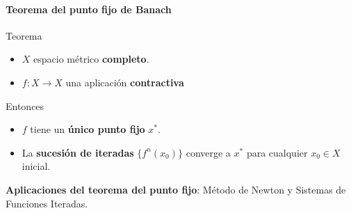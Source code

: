 \begin{frame}{\insertsectionhead}
\framesubtitle{Teorema del punto fijo de Banach}
{\large 
\begin{block}{Teorema}
\begin{itemize}
    \item $X$ espacio métrico \textbf{completo}.
    \item $f:X\longrightarrow X$ una aplicación \textbf{contractiva}
\end{itemize}

Entonces

\begin{itemize}
    \item $f$ tiene un \textbf{único punto fijo} $x^*$.
    \item La \textbf{sucesión de iteradas} $\{f^n(x_0)\}$ converge a $x^*$ para cualquier $x_0\in X$ inicial.
\end{itemize}
\end{block}
\pause

\textbf{Aplicaciones del teorema del punto fijo}: Método de Newton y Sistemas de Funciones Iteradas.

}
\end{frame}

